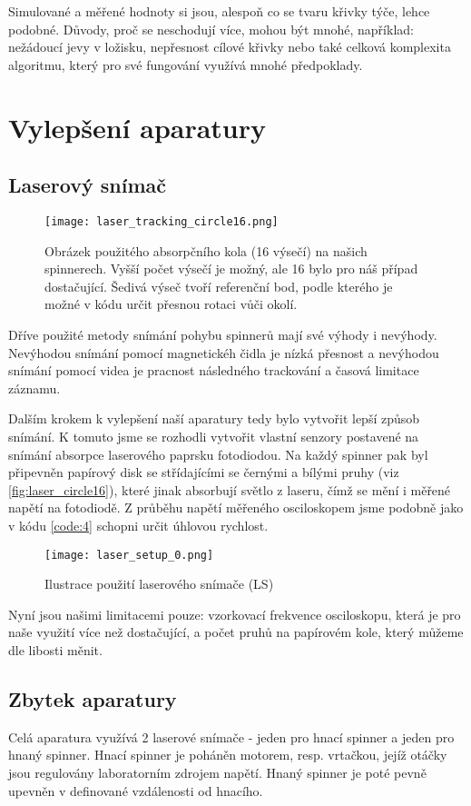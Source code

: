 Simulované a měřené hodnoty si jsou, alespoň co se tvaru křivky týče, lehce podobné. Důvody, proč se neschodují více, mohou být mnohé, například: nežádoucí jevy v ložisku, nepřesnost cílové křivky nebo také celková komplexita algoritmu, který pro své fungování využívá mnohé předpoklady.


\clearpage

\section{Vylepšení aparatury}

\subsection{Laserový snímač}

\begin{wrapfigure}{r}{0.45\textwidth}
    \vspace*{-0.75cm}
    \texttt{[image: laser\_tracking\_circle16.png]}
    \centering
    \caption[Obrázek použitého absorpčního kola]{Obrázek použitého absorpčního kola (16 výsečí) na našich spinnerech. Vyšší počet výsečí je možný, ale 16 bylo pro náš případ dostačující. Šedivá výseč tvoří referenční bod, podle kterého je možné v kódu určit přesnou rotaci vůči okolí. }
    \label{fig:laser_circle16}
\end{wrapfigure}

Dříve použité metody snímání pohybu spinnerů mají své výhody i nevýhody. Nevýhodou snímání pomocí magnetickéh čidla je nízká přesnost a nevýhodou snímání pomocí videa je pracnost následného trackování a časová limitace záznamu.

Dalším krokem k vylepšení naší aparatury tedy bylo vytvořit lepší způsob snímání. K tomuto jsme se rozhodli vytvořit vlastní senzory postavené na snímání absorpce laserového paprsku fotodiodou. Na každý spinner pak byl připevněn papírový disk  se střídajícími se černými a bílými pruhy (viz \autoref{fig:laser_circle16}), které jinak absorbují světlo z laseru, čímž se mění i měřené napětí na fotodiodě. Z průběhu napětí měřeného osciloskopem jsme podobně jako v kódu \ref{code:4} schopni určit úhlovou rychlost.

\begin{wrapfigure}{r}{0.45\textwidth}
    \texttt{[image: laser\_setup\_0.png]}
    \centering
    \caption{Ilustrace použití laserového snímače (LS)}
    \label{fig:laser_circle16}
\end{wrapfigure}
Nyní jsou našimi limitacemi pouze: vzorkovací frekvence osciloskopu, která je pro naše využití více než dostačující, a počet pruhů na papírovém kole, který můžeme dle libosti měnit.

\subsection{Zbytek aparatury}

Celá aparatura využívá 2 laserové snímače - jeden pro hnací spinner a jeden pro hnaný spinner. Hnací spinner je poháněn motorem, resp. vrtačkou, jejíž otáčky jsou regulovány laboratorním zdrojem napětí. Hnaný spinner je poté pevně upevněn v definované vzdálenosti od hnacího.
\clearpage

